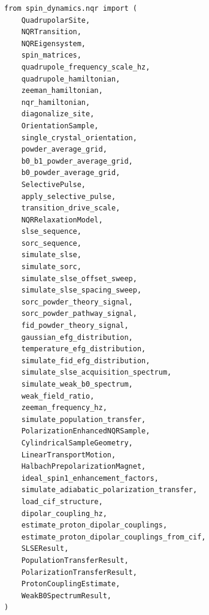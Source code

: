 \documentclass[11pt,oneside]{report}
\begin{document}
\begin{lstlisting}
from spin_dynamics.nqr import (
    QuadrupolarSite,
    NQRTransition,
    NQREigensystem,
    spin_matrices,
    quadrupole_frequency_scale_hz,
    quadrupole_hamiltonian,
    zeeman_hamiltonian,
    nqr_hamiltonian,
    diagonalize_site,
    OrientationSample,
    single_crystal_orientation,
    powder_average_grid,
    b0_b1_powder_average_grid,
    b0_powder_average_grid,
    SelectivePulse,
    apply_selective_pulse,
    transition_drive_scale,
    NQRRelaxationModel,
    slse_sequence,
    sorc_sequence,
    simulate_slse,
    simulate_sorc,
    simulate_slse_offset_sweep,
    simulate_slse_spacing_sweep,
    sorc_powder_theory_signal,
    sorc_powder_pathway_signal,
    fid_powder_theory_signal,
    gaussian_efg_distribution,
    temperature_efg_distribution,
    simulate_fid_efg_distribution,
    simulate_slse_acquisition_spectrum,
    simulate_weak_b0_spectrum,
    weak_field_ratio,
    zeeman_frequency_hz,
    simulate_population_transfer,
    PolarizationEnhancedNQRSample,
    CylindricalSampleGeometry,
    LinearTransportMotion,
    HalbachPrepolarizationMagnet,
    ideal_spin1_enhancement_factors,
    simulate_adiabatic_polarization_transfer,
    load_cif_structure,
    dipolar_coupling_hz,
    estimate_proton_dipolar_couplings,
    estimate_proton_dipolar_couplings_from_cif,
    SLSEResult,
    PopulationTransferResult,
    PolarizationTransferResult,
    ProtonCouplingEstimate,
    WeakB0SpectrumResult,
)
\end{lstlisting}
\end{document}
